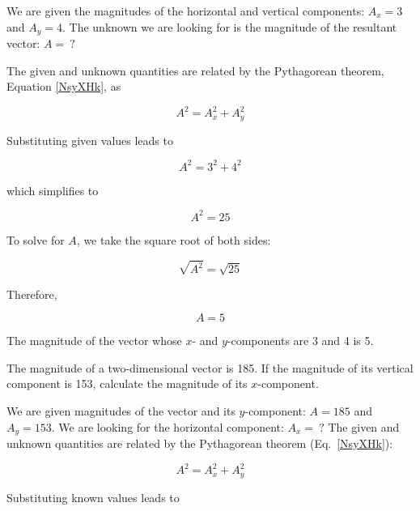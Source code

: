 \documentclass[main.tex]{subfiles}
\begin{document}
\Solution We are given the magnitudes of the horizontal and vertical components: $A_x = 3$ and $A_y = 4$. The unknown we are looking for is the magnitude of the resultant vector: $A =\ ?$

\vspace{1em}

The given and unknown quantities are related by the Pythagorean theorem, Equation \eqref{NsyXHk}, as

\begin{equation*}
    A^2 = A_x^2 + A_y^2
\end{equation*}

Substituting given values leads to 

\begin{equation*}
    A^2 = 3^2 + 4^2
\end{equation*}

which simplifies to

\begin{equation*}
    A^2 = 25
\end{equation*}

To solve for $A$, we take the square root of both sides:

\begin{equation*}
    \sqrt{A^2} = \sqrt{25}
\end{equation*}

Therefore, 

\begin{equation*}
    A = 5
\end{equation*}

The magnitude of the vector whose $x$- and $y$-components are 3 and 4 is 5. 

\endsolution

\begin{example}
    The magnitude of a two-dimensional vector is 185. If the magnitude of its vertical component is 153, calculate the magnitude of its $x$-component. 
\end{example}

\Solution We are given magnitudes of the vector and its $y$-component: $A = 185$ and $A_y = 153$. We are looking for the horizontal component: $A_x =\ ?$ The given and unknown quantities are related by the Pythagorean theorem (Eq.~\ref{NsyXHk}):

\begin{equation*}
    A^2 = A_x^2 + A_y^2
\end{equation*}

Substituting known values leads to 
\end{document}
